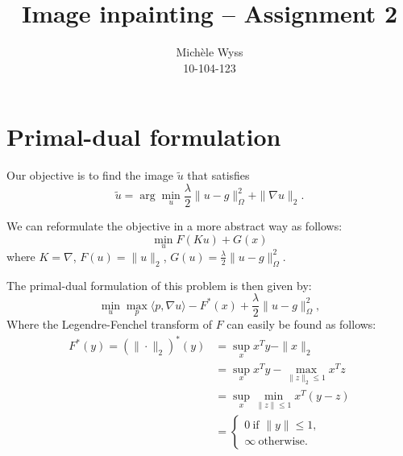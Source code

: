 \documentclass{paper}
\title{Image inpainting -- Assignment 2}
\author{Mich\`ele Wyss \\10-104-123}
\begin{document}
\maketitle


%

\section{Primal-dual formulation}
Our objective is to find the image $\tilde u$ that satisfies 
$$\tilde u = \arg \min_u \frac{\lambda}{2} \|u-g\|_\Omega^2 + \|\nabla u\|_2.$$

\noindent We can reformulate the objective in a more abstract way as follows:
$$\min_{u}F(Ku) + G(x)$$
where $K = \nabla$, $F(u) = \|u\|_2$, $G(u) = \frac{\lambda}{2}\|u-g\|_\Omega^2$.

\noindent The primal-dual formulation of this problem is then given by:
$$\min_u \max_p \langle p,\nabla u \rangle - F^*(x) + \frac{\lambda}{2} \|u-g\|_\Omega^2,$$
Where the Legendre-Fenchel transform of $F$ can easily be found as follows:
\begin{align*}
 F^*(y) = (\|\cdot \|_2)^* (y) &= \sup_x x^Ty - \|x\|_2 \\
 &= \sup_x x^Ty - \max_{\|z\|_2 \leq 1} x^Tz \\
 &= \sup_x \min_{\|z\| \leq 1} x^T (y-z) \\
 &= \begin{cases} 0 ~ \text{if } \|y\| \leq 1, \\ \infty ~ \text{otherwise.} \end{cases}
\end{align*}
\end{document}
